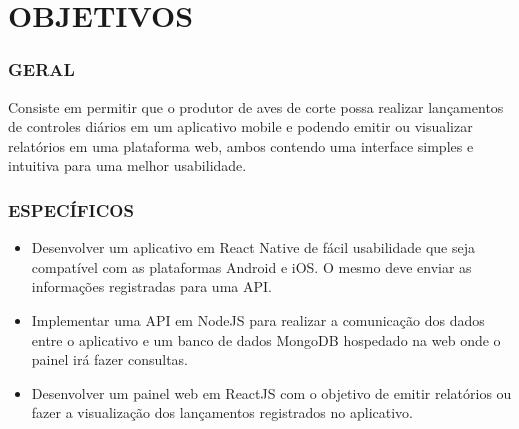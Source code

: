 
\chapter{OBJETIVOS}
\label{chap:objetivos}

\subsection{GERAL}
\label{subsec:objgeral}
Consiste em permitir que o produtor de aves de corte possa realizar lançamentos de controles diários em um aplicativo mobile e podendo emitir ou visualizar relatórios em uma plataforma web, ambos contendo uma interface simples e intuitiva para uma melhor usabilidade.



\subsection{ESPECÍFICOS}
\label{subsec:objesp}

\begin{itemize}
   \item Desenvolver um aplicativo em React Native de fácil usabilidade que seja compatível com as plataformas Android e iOS. O mesmo deve enviar as informações registradas para uma API.
   \item Implementar uma API em NodeJS para realizar a comunicação dos dados entre o aplicativo e um banco de dados MongoDB hospedado na web onde o painel irá fazer consultas.
   \item Desenvolver um painel web em ReactJS com o objetivo de emitir relatórios ou fazer a visualização dos lançamentos registrados no aplicativo.
 \end{itemize}






